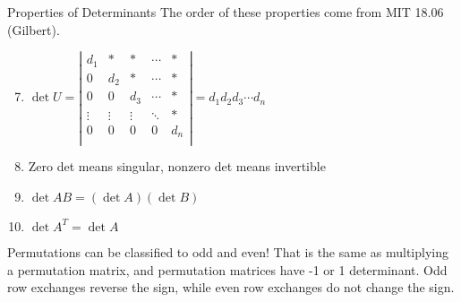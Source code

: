 \documentclass{beamer}
\begin{document}
\begin{frame}{Properties of Determinants}
The order of these properties come from MIT 18.06 (Gilbert).
\begin{enumerate}
    \setcounter{enumi}{6}
    \item $\det U=\left| \begin{matrix}
        d_1&		\ast&		\ast&		\cdots&		\ast\\
        0&		d_2&		\ast&		\cdots&		\ast\\
        0&		0&		d_3&		\cdots&		\ast\\
        \vdots&		\vdots&		\vdots&		\ddots&		\ast\\
        0&		0&		0&		0&		d_n\\
    \end{matrix} \right|=d_1d_2d_3\cdots d_n$
    \item Zero det means singular, nonzero det means invertible
    \item $\det AB=\left( \det A \right) \left( \det B \right)$
    \item $\det A^T = \det A$
\end{enumerate}

Permutations can be classified to odd and even! That is the same as multiplying a permutation matrix, and permutation matrices have -1 or 1 determinant. Odd row exchanges reverse the sign, while even row exchanges do not change the sign.
\end{frame}
\end{document}
